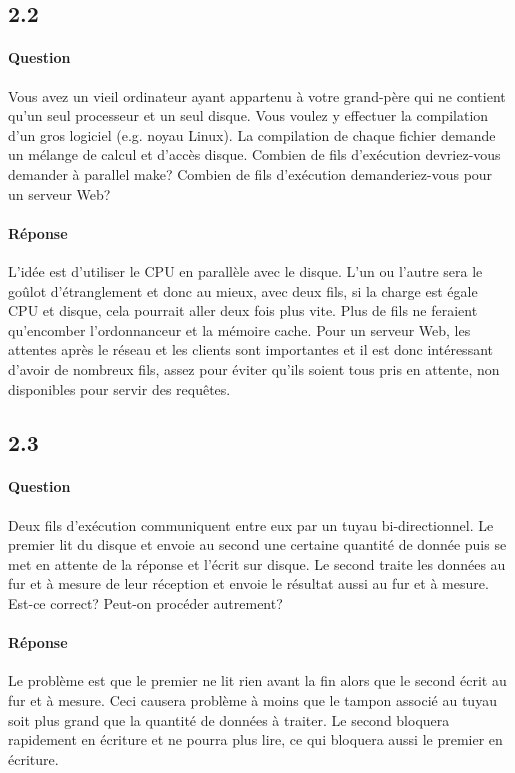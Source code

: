 \documentclass[oneside]{book}
\begin{document}
\subsection{2.2}
\paragraph{Question}
Vous avez un vieil ordinateur ayant appartenu à votre grand-père qui ne contient
qu'un seul processeur et un seul disque. Vous voulez y effectuer la compilation
d'un gros logiciel (e.g. noyau Linux). La compilation de chaque fichier demande un
mélange de calcul et d'accès disque. Combien de fils d'exécution devriez-vous
demander à parallel make? Combien de fils d'exécution demanderiez-vous pour
un serveur Web?
\paragraph{Réponse}
L'idée est d'utiliser le CPU en parallèle avec le disque. L'un ou l'autre sera le
goûlot d'étranglement et donc au mieux, avec deux fils, si la charge est égale
CPU et disque, cela pourrait aller deux fois plus vite. Plus de fils ne feraient
qu'encomber l'ordonnanceur et la mémoire cache. Pour un serveur Web, les
attentes après le réseau et les clients sont importantes et il est donc intéressant
d'avoir de nombreux fils, assez pour éviter qu'ils soient tous pris en attente, non
disponibles pour servir des requêtes.
\subsection{2.3}
\paragraph{Question}
Deux fils d'exécution communiquent entre eux par un tuyau bi-directionnel. Le
premier lit du disque et envoie au second une certaine quantité de donnée puis se
met en attente de la réponse et l'écrit sur disque. Le second traite les données au
fur et à mesure de leur réception et envoie le résultat aussi au fur et à mesure.
Est-ce correct? Peut-on procéder autrement?
\paragraph{Réponse}
Le problème est que le premier ne lit rien avant la fin alors que le second écrit au
fur et à mesure. Ceci causera problème à moins que le tampon associé au tuyau
soit plus grand que la quantité de données à traiter. Le second bloquera
rapidement en écriture et ne pourra plus lire, ce qui bloquera aussi le premier en
écriture.
\end{document}
